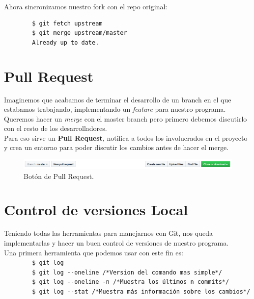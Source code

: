 \documentclass[a4paper, 12pt]{article}
\begin{document}
Ahora sincronizamos nuestro fork con el repo original:

\begin{verbatim}
        $ git fetch upstream
        $ git merge upstream/master
        Already up to date.
\end{verbatim}

\newpage

\section{Pull Request}

Imaginemos que acabamos de terminar el desarrollo de un branch en el que estabamos trabajando, implementando un \textit{feature} para nuestro programa. Queremos hacer un \textit{merge} con el master branch pero primero debemos discutirlo con el resto de los desarrolladores.\\
Para eso sirve un \textbf{Pull Request}, notifica a todos los involucrados en el proyecto y crea un entorno para poder discutir los cambios antes de hacer el merge.\\

\begin{figure}[h!]
\centering
\includegraphics[scale=0.4]{pull.png}
\caption{\small Botón de Pull Request.}
\end{figure}

\section{Control de versiones Local}

Teniendo todas las herramientas para manejarnos con Git, nos queda implementarlas y hacer un buen control de versiones de nuestro programa.\\

Una primera herramienta que podemos usar con este fin es:\\

\verb+        $ git log+\\
\verb+        $ git log --oneline /*Version del comando mas simple*/+\\
\verb+        $ git log --oneline -n /*Muestra los últimos n commits*/+\\
\verb+        $ git log --stat /*Muestra más información sobre los cambios*/+\\
\end{document}
